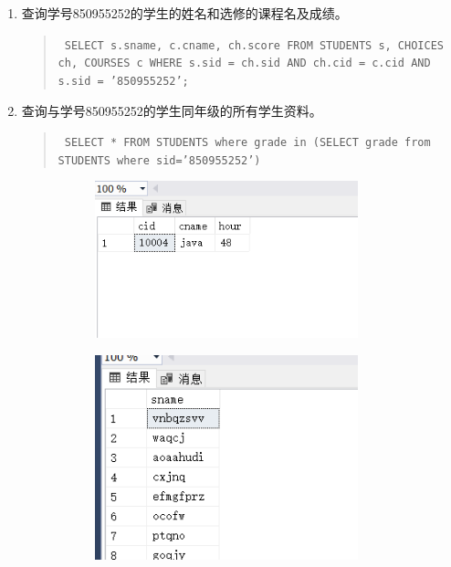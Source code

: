 \documentclass[a4paper,twoside]{article}
\begin{document}
\begin{spacing}{1.2}
\begin{enumerate}
\item 查询学号850955252的学生的姓名和选修的课程名及成绩。
\begin{quote}
\texttt{
SELECT s.sname, c.cname, ch.score
FROM STUDENTS s, CHOICES ch, COURSES c
WHERE s.sid = ch.sid AND ch.cid = c.cid AND s.sid = '850955252';
}
\end{quote}
\item 查询与学号850955252的学生同年级的所有学生资料。
\begin{quote}
\texttt{
SELECT * FROM STUDENTS 
where grade in (SELECT grade from STUDENTS where sid='850955252')
}
\end{quote}

\begin{figure}[h]
\centering
\caption{运行结果}
\begin{subfigure}{0.3\textwidth}
  \includegraphics[width=0.9\textwidth]{fig19.png}
\end{subfigure}
\begin{subfigure}{0.3\textwidth}
  \includegraphics[width=0.9\textwidth]{fig20.png}
\end{subfigure}
\end{figure}


\end{enumerate}
\end{spacing}
\end{document}
